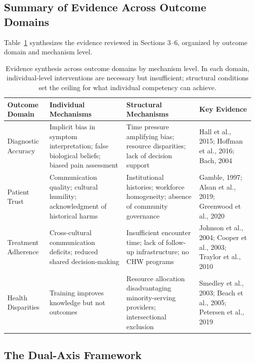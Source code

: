 \documentclass[12pt, a4paper]{article}
\begin{document}
\subsection{Summary of Evidence Across Outcome Domains}

Table~\ref{tab:evidence} synthesizes the evidence reviewed in Sections 3--6, organized by outcome domain and mechanism level.

\begin{table}[htbp]
\centering
\small
\caption{Evidence synthesis across outcome domains by mechanism level. In each domain, individual-level interventions are necessary but insufficient; structural conditions set the ceiling for what individual competency can achieve.}
\label{tab:evidence}
\begin{tabular}{p{2.2cm}p{3.5cm}p{3.5cm}p{3.5cm}}
\toprule
\textbf{Outcome Domain} & \textbf{Individual Mechanisms} & \textbf{Structural Mechanisms} & \textbf{Key Evidence} \\
\midrule
Diagnostic Accuracy & Implicit bias in symptom interpretation; false biological beliefs; biased pain assessment & Time pressure amplifying bias; resource disparities; lack of decision support & Hall et al., 2015; Hoffman et al., 2016; Bach, 2004 \\
\addlinespace
Patient Trust & Communication quality; cultural humility; acknowledgment of historical harms & Institutional histories; workforce homogeneity; absence of community governance & Gamble, 1997; Alsan et al., 2019; Greenwood et al., 2020 \\
\addlinespace
Treatment Adherence & Cross-cultural communication deficits; reduced shared decision-making & Insufficient encounter time; lack of follow-up infrastructure; no CHW programs & Johnson et al., 2004; Cooper et al., 2003; Traylor et al., 2010 \\
\addlinespace
Health Disparities & Training improves knowledge but not outcomes & Resource allocation disadvantaging minority-serving providers; intersectional exclusion & Smedley et al., 2003; Beach et al., 2005; Petersen et al., 2019 \\
\bottomrule
\end{tabular}
\end{table}

\subsection{The Dual-Axis Framework}
\end{document}
